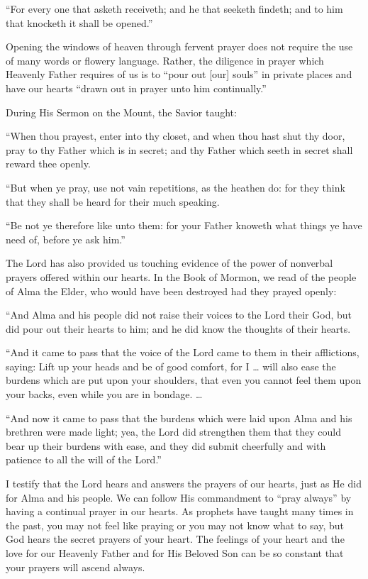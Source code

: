\documentclass[letterpaper, 11pt]{report}
\begin{document}
“For every one that asketh receiveth; and he that seeketh findeth; and to him that knocketh it shall be opened.”

Opening the windows of heaven through fervent prayer does not require the use of many words or flowery language. Rather, the diligence in prayer which Heavenly Father requires of us is to “pour out [our] souls” in private places and have our hearts “drawn out in prayer unto him continually.”

During His Sermon on the Mount, the Savior taught:

“When thou prayest, enter into thy closet, and when thou hast shut thy door, pray to thy Father which is in secret; and thy Father which seeth in secret shall reward thee openly.

“But when ye pray, use not vain repetitions, as the heathen do: for they think that they shall be heard for their much speaking.

“Be not ye therefore like unto them: for your Father knoweth what things ye have need of, before ye ask him.”

The Lord has also provided us touching evidence of the power of nonverbal prayers offered within our hearts. In the Book of Mormon, we read of the people of Alma the Elder, who would have been destroyed had they prayed openly:

“And Alma and his people did not raise their voices to the Lord their God, but did pour out their hearts to him; and he did know the thoughts of their hearts.

“And it came to pass that the voice of the Lord came to them in their afflictions, saying: Lift up your heads and be of good comfort, for I … will also ease the burdens which are put upon your shoulders, that even you cannot feel them upon your backs, even while you are in bondage. …

“And now it came to pass that the burdens which were laid upon Alma and his brethren were made light; yea, the Lord did strengthen them that they could bear up their burdens with ease, and they did submit cheerfully and with patience to all the will of the Lord.”

I testify that the Lord hears and answers the prayers of our hearts, just as He did for Alma and his people. We can follow His commandment to “pray always” by having a continual prayer in our hearts. As prophets have taught many times in the past, you may not feel like praying or you may not know what to say, but God hears the secret prayers of your heart. The feelings of your heart and the love for our Heavenly Father and for His Beloved Son can be so constant that your prayers will ascend always.
\end{document}
